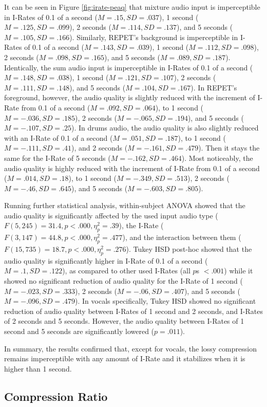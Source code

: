 It can be seen in Figure \ref{fig:irate-peaq} that mixture audio input is imperceptible in I-Rates of 0.1 of a second ($M=.15, SD=.037$), 1 second ($M=.125, SD=.099$), 2 seconds ($M=.114, SD=.137$), and 5 seconds ($M=.105, SD=.166$).
Similarly, REPET's background is imperceptible in I-Rates of 0.1 of a second ($M=.143, SD=.039$), 1 second ($M=.112, SD=.098$), 2 seconds ($M=.098, SD=.165$), and 5 seconds ($M=.089, SD=.187$).
Identically, the sum audio input is imperceptible in I-Rates of 0.1 of a second ($M=.148, SD=.038$), 1 second ($M=.121, SD=.107$), 2 seconds ($M=.111, SD=.148$), and 5 seconds ($M=.104, SD=.167$).
In REPET's foreground, however, the audio quality is slightly reduced with the increment of I-Rate from 0.1 of a second ($M=.092, SD=.064$), to 1 second ($M=-.036, SD=.185$), 2 seconds ($M=-.065, SD=.194$), and 5 seconds ($M=-.107, SD=.25$).
In drums audio, the audio quality is also slightly reduced with an I-Rate of 0.1 of a second ($M=.051, SD=.187$), to 1 second ($M=-.111, SD=.41$), and 2 seconds ($M=-.161, SD=.479$). Then it stays the same for the I-Rate of 5 seconds ($M=-.162, SD=.464$).
Most noticeably, the audio quality is highly reduced with the increment of I-Rate from 0.1 of a second ($M=.014, SD=.18$), to 1 second ($M=-.349, SD=.513$), 2 seconds ($M=-.46, SD=.645$), and 5 seconds ($M=-.603, SD=.805$).

Running further statistical analysis,  within-subject ANOVA showed that the audio quality is significantly affected by the used input audio type ($F(5,245)=31.4, p<.000, \eta_{p}^{2}=.39$), the I-Rate ($F(3,147)=44.8, p<.000, \eta_{p}^{2}=.477$), and the interaction between them ($F(15,735)=18.7, p<.000, \eta_{p}^{2}=.276$).
Tukey HSD post-hoc showed that the audio quality is significantly higher in I-Rate of 0.1 of a second ($M=.1, SD=.122$), as compared to other used I-Rates (all $p$s $<.001$) while it showed no significant reduction of audio quality for the I-Rate of 1 second ($M=-.023, SD=.333$), 2 seconds ($M=-.06, SD=.407$), and 5 seconds ($M=-.096, SD=.479$). In vocals specifically, Tukey HSD showed no significant reduction of audio quality between I-Rates of 1 second and 2 seconds, and I-Rates of 2 seconds and 5 seconds. However, the audio quality between I-Rates of 1 second and 5 seconds are significantly lowered ($p=.011$).

In summary, the results confirmed that, except for vocals, the lossy compression remains imperceptible with any amount of I-Rate and it stabilizes when it is higher than 1 second.

\subsection{Compression Ratio}

